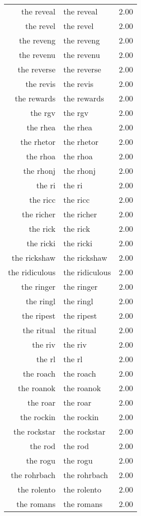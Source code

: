 \begin{table}[ht]
\begin{tabular}{rlr}
  the reveal & the reveal & 2.00 \\ 
  the revel & the revel & 2.00 \\ 
  the reveng & the reveng & 2.00 \\ 
  the revenu & the revenu & 2.00 \\ 
  the reverse & the reverse & 2.00 \\ 
  the revis & the revis & 2.00 \\ 
  the rewards & the rewards & 2.00 \\ 
  the rgv & the rgv & 2.00 \\ 
  the rhea & the rhea & 2.00 \\ 
  the rhetor & the rhetor & 2.00 \\ 
  the rhoa & the rhoa & 2.00 \\ 
  the rhonj & the rhonj & 2.00 \\ 
  the ri & the ri & 2.00 \\ 
  the ricc & the ricc & 2.00 \\ 
  the richer & the richer & 2.00 \\ 
  the rick & the rick & 2.00 \\ 
  the ricki & the ricki & 2.00 \\ 
  the rickshaw & the rickshaw & 2.00 \\ 
  the ridiculous & the ridiculous & 2.00 \\ 
  the ringer & the ringer & 2.00 \\ 
  the ringl & the ringl & 2.00 \\ 
  the ripest & the ripest & 2.00 \\ 
  the ritual & the ritual & 2.00 \\ 
  the riv & the riv & 2.00 \\ 
  the rl & the rl & 2.00 \\ 
  the roach & the roach & 2.00 \\ 
  the roanok & the roanok & 2.00 \\ 
  the roar & the roar & 2.00 \\ 
  the rockin & the rockin & 2.00 \\ 
  the rockstar & the rockstar & 2.00 \\ 
  the rod & the rod & 2.00 \\ 
  the rogu & the rogu & 2.00 \\ 
  the rohrbach & the rohrbach & 2.00 \\ 
  the rolento & the rolento & 2.00 \\ 
  the romans & the romans & 2.00 \\ 

\end{tabular}
\end{table}
